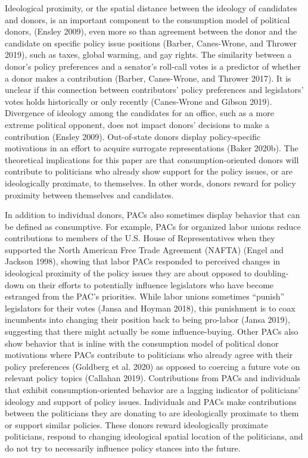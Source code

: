 \documentclass[12pt,]{article}
\begin{document}
Ideological proximity, or the spatial distance between the ideology of
candidates and donors, is an important component to the consumption
model of political donors, (Ensley 2009), even more so than agreement
between the donor and the candidate on specific policy issue positions
(Barber, Canes-Wrone, and Thrower 2019), such as taxes, global warming,
and gay rights. The similarity between a donor's policy preferences and
a senator's roll-call votes is a predictor of whether a donor makes a
contribution (Barber, Canes-Wrone, and Thrower 2017). It is unclear if
this connection between contributors' policy preferences and
legislators' votes holds historically or only recently (Canes-Wrone and
Gibson 2019). Divergence of ideology among the candidates for an office,
such as a more extreme political opponent, does not impact donors'
decisions to make a contribution (Ensley 2009). Out-of-state donors
display policy-specific motivations in an effort to acquire surrogate
representations (Baker 2020b). The theoretical implications for this
paper are that consumption-oriented donors will contribute to
politicians who already show support for the policy issues, or are
ideologically proximate, to themselves. In other words, donors reward
for policy proximity between themselves and candidates.

In addition to individual donors, PACs also sometimes display behavior
that can be defined as consumptive. For example, PACs for organized
labor unions reduce contributions to members of the U.S. House of
Representatives when they supported the North American Free Trade
Agreement (NAFTA) (Engel and Jackson 1998), showing that labor PACs
responded to perceived changes in ideological proximity of the policy
issues they are about opposed to doubling-down on their efforts to
potentially influence legislators who have become estranged from the
PAC's priorities. While labor unions sometimes ``punish'' legislators
for their votes (Jansa and Hoyman 2018), this punishment is to coax
incumbents into changing their position back to being pro-labor (Jansa
2019), suggesting that there might actually be some influence-buying.
Other PACs also show behavior that is inline with the consumption model
of political donor motivations where PACs contribute to politicians who
already agree with their policy preferences (Goldberg et al. 2020) as
opposed to coercing a future vote on relevant policy topics (Callahan
2019). Contributions from PACs and individuals that exhibit
consumption-oriented behavior are a lagging indicator of politicians'
ideology and support of policy issues. Individuals and PACs make
contributions between the politicians they are donating to are
ideologically proximate to them or support similar policies. These
donors reward ideologically proximate politicians, respond to changing
ideological spatial location of the politicians, and do not try to
necessarily influence policy stances into the future.
\end{document}
